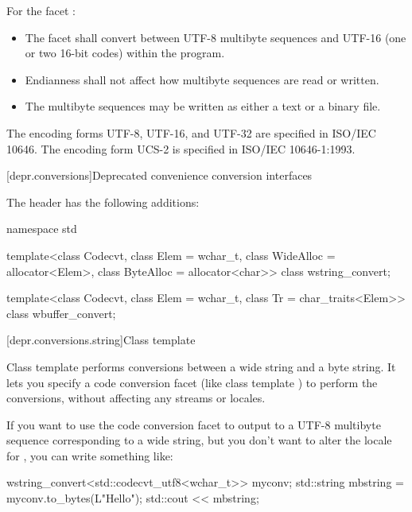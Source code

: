\pnum
For the facet :
\begin{itemize}
\item
  The facet shall convert between UTF-8 multibyte sequences
  and UTF-16 (one or two 16-bit codes) within the program.
\item
  Endianness shall not affect how multibyte sequences are read or written.
\item
  The multibyte sequences may be written as either a text or a binary file.
\end{itemize}

\pnum
The encoding forms UTF-8, UTF-16, and UTF-32 are specified in ISO/IEC 10646.
The encoding form UCS-2 is specified in ISO/IEC 10646-1:1993.

[depr.conversions]{Deprecated convenience conversion interfaces}

\pnum
The header  has the following additions:

\begin{codeblock}
namespace std {
  template<class Codecvt, class Elem = wchar_t,
           class WideAlloc = allocator<Elem>,
           class ByteAlloc = allocator<char>>
    class wstring_convert;

  template<class Codecvt, class Elem = wchar_t,
           class Tr = char_traits<Elem>>
    class wbuffer_convert;
}
\end{codeblock}

[depr.conversions.string]{Class template }

\pnum
Class template  performs conversions between a wide
string and a byte string. It lets you specify a code conversion facet
(like class template ) to perform the conversions, without
affecting any streams or locales.
\begin{example}
If you want to use the code
conversion facet  to output to  a UTF-8
multibyte sequence corresponding to a wide string, but you don't want to
alter the locale for , you can write something like:
\begin{codeblock}
wstring_convert<std::codecvt_utf8<wchar_t>> myconv;
std::string mbstring = myconv.to_bytes(L"Hello\n");
std::cout << mbstring;
\end{codeblock}
\end{example}

